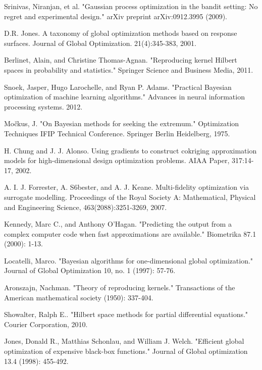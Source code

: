 \documentclass[a4paper,onecolumn]{article}
\theoremstyle{remark}
\begin{document}
\begin{thebibliography}{1}
Srinivas, Niranjan, et al. "Gaussian process optimization in the bandit setting: No regret and experimental design." arXiv preprint arXiv:0912.3995 (2009).

D.R.  Jones.   A  taxonomy  of  global  optimization  methods  based  on  response  surfaces.
Journal of Global Optimization.
21(4):345-383, 2001.


Berlinet, Alain, and Christine Thomas-Agnan. 
"Reproducing kernel Hilbert spaces in probability and statistics."
Springer Science and Business Media, 2011.

Snoek, Jasper, Hugo Larochelle, and Ryan P. Adams. "Practical Bayesian optimization of machine learning algorithms." Advances in neural information processing systems. 2012.

Močkus, J. "On Bayesian methods for seeking the extremum." Optimization Techniques IFIP Technical Conference. Springer Berlin Heidelberg, 1975.

H. Chung and J. J. Alonso. Using gradients to construct cokriging approximation
models for high-dimensional design optimization problems. AIAA Paper, 317:14-
17, 2002.

A. I. J. Forrester, A. S6bester, and A. J. Keane. Multi-fidelity optimization via
surrogate modelling. Proceedings of the Royal Society A: Mathematical, Physical
and Engineering Science, 463(2088):3251-3269, 2007.


Kennedy, Marc C., and Anthony O'Hagan. 
"Predicting the output from a complex computer code when fast approximations are available." 
Biometrika 87.1 (2000): 1-13.

Locatelli, Marco. "Bayesian algorithms for one-dimensional global optimization." Journal of Global Optimization 10, no. 1 (1997): 57-76.

Aronszajn, Nachman. 
"Theory of reproducing kernels." 
Transactions of the American mathematical society (1950): 337-404.

Showalter, Ralph E.. 
"Hilbert space methods for partial differential equations."
Courier Corporation, 2010.

Jones, Donald R., Matthias Schonlau, and William J. Welch. 
"Efficient global optimization of expensive black-box functions." 
Journal of Global optimization 13.4 (1998): 455-492.


\end{thebibliography}
\end{document}
